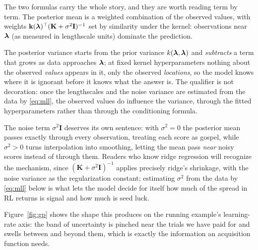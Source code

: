 The two formulas
carry the whole story, and they are worth reading term by term. The posterior mean is a weighted
combination of the observed values, with weights
$\mathbf{k}(\bm{\lambda})^\top (\mathbf{K} + \sigma^2 \mathbf{I})^{-1}$ set by
similarity under the kernel: observations near $\bm{\lambda}$ (as measured in
lengthscale units) dominate the prediction.

The posterior variance starts
from the prior variance $k(\bm{\lambda},\bm{\lambda})$ and \emph{subtracts} a term
that grows as data approaches $\bm{\lambda}$; at fixed kernel
hyperparameters nothing about the observed \emph{values} appears in it,
only the observed \emph{locations}, so the model knows where it is
ignorant before it knows what the answer is. The qualifier is not
decoration: once the lengthscales and the noise variance are estimated
from the data by \eqref{eq:mll}, the observed values do influence the
variance, through the fitted hyperparameters rather than through the
conditioning formula.

The noise term $\sigma^2 \mathbf{I}$ deserves its own sentence: with
$\sigma^2 = 0$ the posterior mean passes exactly through every
observation, treating each score as gospel, while $\sigma^2 > 0$ turns
interpolation into smoothing, letting the mean pass \emph{near} noisy
scores instead of through them. Readers who know ridge regression will
recognize the mechanism, since $(\mathbf{K} + \sigma^2\mathbf{I})^{-1}$
applies precisely ridge's shrinkage, with the noise variance as the
regularization constant; estimating $\sigma^2$ from the data by
\eqref{eq:mll} below is what lets the model decide for itself how much
of the spread in RL returns is signal and how much is seed luck.

Figure~\ref{fig:gp} shows the shape this produces on the running example's
learning-rate axis: the band of uncertainty is pinched near the trials we
have paid for and swells between and beyond them, which is exactly the
information an acquisition function needs.

